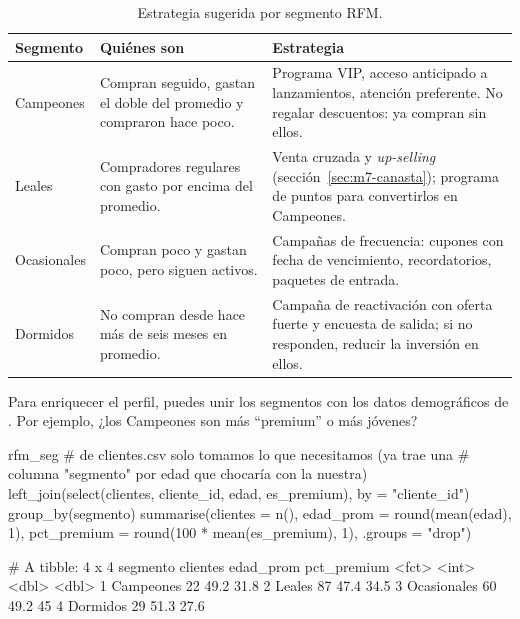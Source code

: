 \begin{table}[H]
\centering
\small
\caption{Estrategia sugerida por segmento RFM.}
\label{tab:m7-estrategias}
\begin{tabularx}{\textwidth}{>{\raggedright\arraybackslash}p{2.2cm}
                              >{\raggedright\arraybackslash}p{4.2cm}
                              >{\raggedright\arraybackslash}X}
\toprule
\textbf{Segmento} & \textbf{Quiénes son} & \textbf{Estrategia} \\
\midrule
Campeones & Compran seguido, gastan el doble del promedio y compraron hace poco. &
  Programa VIP, acceso anticipado a lanzamientos, atención preferente. No
  regalar descuentos: ya compran sin ellos. \\
Leales & Compradores regulares con gasto por encima del promedio. &
  Venta cruzada y \emph{up-selling} (sección~\ref{sec:m7-canasta}); programa
  de puntos para convertirlos en Campeones. \\
Ocasionales & Compran poco y gastan poco, pero siguen activos. &
  Campañas de frecuencia: cupones con fecha de vencimiento, recordatorios,
  paquetes de entrada. \\
Dormidos & No compran desde hace más de seis meses en promedio. &
  Campaña de reactivación con oferta fuerte y encuesta de salida; si no
  responden, reducir la inversión en ellos. \\
\bottomrule
\end{tabularx}
\end{table}

Para enriquecer el perfil, puedes unir los segmentos con los datos
demográficos de . Por ejemplo, ¿los Campeones son más
``premium'' o más jóvenes?

\begin{rcode}
rfm_seg %
  # de clientes.csv solo tomamos lo que necesitamos (ya trae una
  # columna "segmento" por edad que chocaría con la nuestra)
  left_join(select(clientes, cliente_id, edad, es_premium),
            by = "cliente_id") %
  group_by(segmento) %
  summarise(clientes    = n(),
            edad_prom   = round(mean(edad), 1),
            pct_premium = round(100 * mean(es_premium), 1),
            .groups = "drop")
\end{rcode}

\begin{rsalida}
# A tibble: 4 x 4
  segmento    clientes edad_prom pct_premium
  <fct>          <int>     <dbl>       <dbl>
1 Campeones         22      49.2        31.8
2 Leales            87      47.4        34.5
3 Ocasionales       60      49.2        45  
4 Dormidos          29      51.3        27.6
\end{rsalida}

